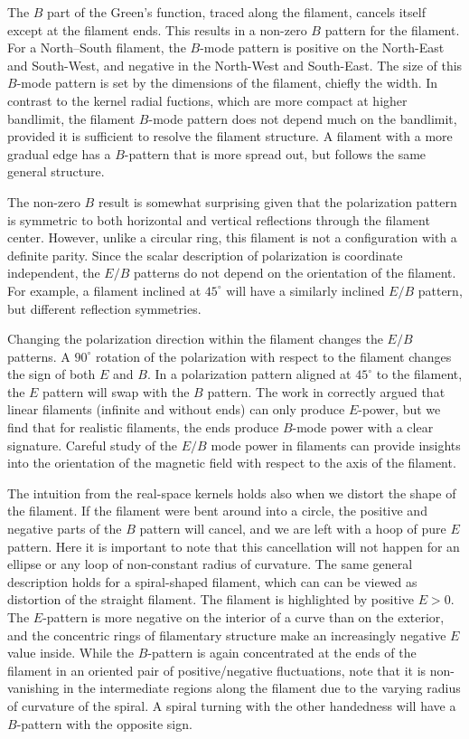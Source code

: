 The $B$ part of the Green's function, traced along the filament, cancels itself except at the filament ends.  This results in a non-zero $B$ pattern for the filament.  For a North--South filament, the $B$-mode pattern is positive on the North-East and South-West, and negative in the North-West and South-East.  The size of this $B$-mode pattern is set by the dimensions of the filament, chiefly the width.  In contrast to the kernel radial fuctions, which are more compact at higher bandlimit, the filament $B$-mode  pattern does not depend much on the bandlimit, provided it is sufficient to resolve the filament structure.  A filament with a more gradual edge has a $B$-pattern that is more spread out, but follows the same general structure.

The non-zero $B$ result is somewhat surprising given that the polarization pattern is symmetric to both horizontal and vertical reflections through the filament center.  However, unlike a circular ring, this filament is not a configuration with a definite parity.  Since the scalar description of polarization is coordinate independent, the $E/B$ patterns do not depend on the orientation of the filament.  For example, a filament inclined at $45^\circ$ will have a similarly inclined $E/B$ pattern, but different reflection symmetries.  

Changing the polarization direction within the filament changes the $E/B$ patterns.  A $90^\circ$ rotation of the polarization with respect to the filament changes the sign of both $E$ and $B$.  In a polarization pattern aligned at $45^\circ$ to the filament, the $E$ pattern will swap with the $B$ pattern.  The work in \cite{Zaldarriaga2001a} correctly argued that linear filaments (infinite and without ends) can only produce $E$-power, but we find that for realistic filaments, the ends produce $B$-mode power with a clear signature.  Careful study of the $E/B$ mode power in filaments can provide insights into the orientation of the magnetic field with respect to the axis of the filament.

The intuition from the real-space kernels holds also when we distort the shape of the filament.  If the filament were bent around into a circle, the positive and negative parts of the $B$ pattern will cancel, and we are left with a hoop of pure $E$ pattern. Here it is important to note that this cancellation will not happen for an ellipse or any loop of non-constant radius of curvature.  The same general description holds for a spiral-shaped filament, which can can be viewed as distortion of the straight filament.  The filament is highlighted by positive $E>0$.  The $E$-pattern is more negative on the interior of a curve than on the exterior, and the concentric rings of filamentary structure make an increasingly negative $E$ value inside. While the $B$-pattern is again concentrated at the ends of the filament in an oriented pair of positive/negative fluctuations, note that it is non-vanishing in the intermediate regions along the filament due to the varying radius of curvature of the spiral.  A spiral turning with the other handedness will have a $B$-pattern with the opposite sign.

